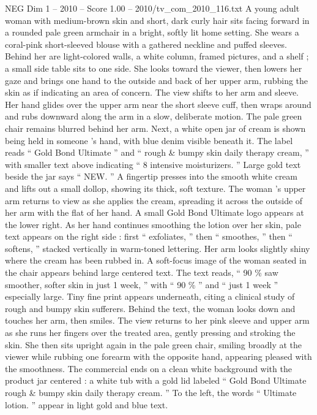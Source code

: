 \begin{textsample}{NEG Dim 1 – 2010 – Score 1.00 – 2010/tv\_com\_2010\_116.txt}  \label{ex:f1_neg_075}
A young adult woman with medium-brown skin and short, dark curly hair sits facing forward in a rounded pale green armchair in a bright, softly lit home setting.
She wears a coral-pink short-sleeved blouse with a gathered neckline and puffed sleeves.
Behind her are light-colored walls, a white column, framed pictures, and a shelf ; a small side table sits to one side.
She looks toward the viewer, then lowers her gaze and brings one hand to the outside and back of her upper arm, rubbing the skin as if indicating an area of concern.
The view shifts to her arm and sleeve.
Her hand glides over the upper arm near the short sleeve cuff, then wraps around and rubs downward along the arm in a slow, deliberate motion.
The pale green chair remains blurred behind her arm.
Next, a white open jar of cream is shown being held in someone ’s hand, with blue denim visible beneath it.
The label reads “ Gold Bond Ultimate ” and “ rough \& bumpy skin daily therapy cream, ” with smaller text above indicating “ 8 intensive moisturizers. ” Large gold text beside the jar says “ NEW. ” A fingertip presses into the smooth white cream and lifts out a small dollop, showing its thick, soft texture.
The woman ’s upper arm returns to view as she applies the cream, spreading it across the outside of her arm with the flat of her hand.
A small Gold Bond Ultimate logo appears at the lower right.
As her hand continues smoothing the lotion over her skin, pale text appears on the right side : first “ exfoliates, ” then “ smoothes, ” then “ softens, ” stacked vertically in warm-toned lettering.
Her arm looks slightly shiny where the cream has been rubbed in.
A soft-focus image of the woman seated in the chair appears behind large centered text.
The text reads, “ 90 \% saw smoother, softer skin in just 1 week, ” with “ 90 \% ” and “ just 1 week ” especially large.
Tiny fine print appears underneath, citing a clinical study of rough and bumpy skin sufferers.
Behind the text, the woman looks down and touches her arm, then smiles.
The view returns to her pink sleeve and upper arm as she runs her fingers over the treated area, gently pressing and stroking the skin.
She then sits upright again in the pale green chair, smiling broadly at the viewer while rubbing one forearm with the opposite hand, appearing pleased with the smoothness.
The commercial ends on a clean white background with the product jar centered : a white tub with a gold lid labeled “ Gold Bond Ultimate rough \& bumpy skin daily therapy cream. ” To the left, the words “ Ultimate lotion. ” appear in light gold and blue text.

\end{textsample}
